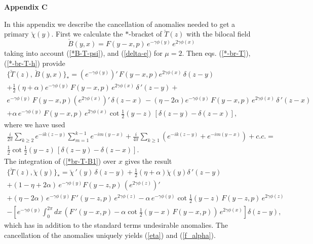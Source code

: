 \documentclass[a4paper,12pt]{article}
\def\theequation{\arabic{section}.\arabic{equation}}
\begin{document}
\setcounter{equation}{0}
\def\theequation{C.\arabic{equation}}

{\bf {\Large Appendix C}}

\vspace{0.5cm}

\noindent
In this appendix we describe the cancellation of anomalies
needed to get a primary $\check\chi(y)$.
First we calculate the $*$-bracket of $\check T(z)$ with the
bilocal field
\begin{equation}
\check B(y,x)=F(y-x,p)\,e^{-\gamma\phi(y)}\,e^{2\gamma\phi(x)}
\end{equation}
taking into account
(\ref{*B-T-psi}), and (\ref{delta-e}) for $\mu =2$. Then eqs.
(\ref{*-br-T}), (\ref{*-br-T-h}) provide
\begin{eqnarray}\label{*b-T-B}
\{\check T (z),\,\check B(y,x)\}_*=
\left(e^{-\gamma\phi(y)}\right)'\,F(y-x,p) e^{2\gamma\phi(x)}\, \delta (z-y)
~~~~~~~~~~~~~\nonumber\\
+\frac{1}{2}\left(\eta +\alpha\right)
e^{-\gamma\phi(y)}\,F(y-x,p)\, e^{2\gamma\phi(x)}\,\delta\,' (z-y)+\nonumber\\
e^{-\gamma\phi(y)}\,F(y-x,p)\left( e^{2\gamma\phi(x)}\right)'\,\delta (z-x)\,
-\left(\eta -2\alpha\right)
e^{-\gamma\phi(y)}\,F(y-x,p)\, e^{2\gamma\phi(x)}\,\delta\,' (z-x)\nonumber\\
+\alpha\,e^{-\gamma\phi(y)}\,F(y-x,p)\, e^{2\gamma\phi(x)}
\cot\frac{1}{2}(y-z)\,[\delta (z-y)-\delta (z-x)],
\end{eqnarray}
where we have used
\begin{eqnarray}\label{*br-T-B1}
\frac{i}{2\pi}\sum_{k\geq 2} e^{-ik(z-y)}\sum_{m=1}^{k-1}e^{-im(y-x)}
+\frac{i}{4\pi}\sum_{k\geq 1}\left( e^{-ik(z-y)}+e^{-im(y-x)}\right)
+c.c.=\nonumber \\
\frac{1}{2}\cot\frac{1}{2}(y-z)\,[\delta (z-y)-\delta (z-x)].
\end{eqnarray}
The integration of (\ref{*br-T-B1}) over $x$ gives the result
\begin{eqnarray}\label{*br-T-chi1}
\{\check T (z),\check\chi(y)\}_*=\check\chi\,'(y)\,\delta (z-y) +\frac{1}{2}
\left(\eta +\alpha\right)\check\chi(y)\delta\,'(z-y) \nonumber\\
+\left(1-\eta+2\alpha\right)\,e^{-\gamma\phi(y)}
F(y-z,p)\,\left(e^{2\gamma\phi(z)}\right)'
\nonumber \\
+(\eta-2\alpha)\,e^{-\gamma\phi(y)}
F\,'(y-z,p)\,e^{2\gamma\phi(z)}
-\alpha\,e^{-\gamma\phi(y)}
\cot\frac{1}{2}(y-z)\,F (y-z,p)\,e^{2\gamma\phi(z)}\nonumber\\
-\left[e^{-\gamma\phi(y)}
\int_0^{2\pi}dx\,\left(F\,'(y-x,p)-
\alpha\cot\frac{1}{2}(y-x)\,F(y-x,p)\right)
\,e^{2\gamma\phi(x)}\right]\delta(z-y),
\end{eqnarray}
which has in addition to the standard terms undesirable anomalies.
The cancellation of the anomalies uniquely yields
(\ref{eta}) and (\ref{f_alpha}).
\end{document}
